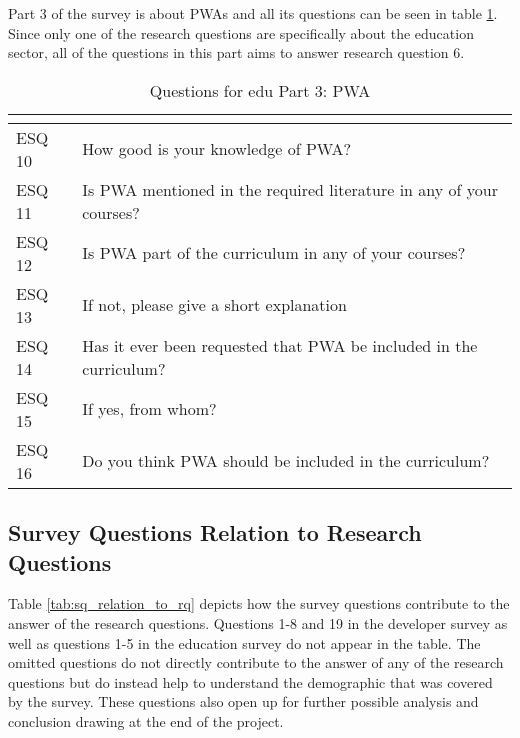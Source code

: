 \documentclass[a4paper,12pt]{article}
\begin{document}
Part 3 of the survey is about PWAs and all its questions can be seen in table \ref{tab:eduq3}. Since only one of the research questions are specifically about the education sector, all of the questions in this part aims to answer research question 6.

\begin{table}[ht]
\centering
{}
\begin{tabular}{|l|l|}
\hline
\rowcolor[HTML]{656565} 
\multicolumn{1}{|c|}{\cellcolor[HTML]{656565}{\color[HTML]{FFFFFF} Number}} & \multicolumn{1}{l|}{\cellcolor[HTML]{656565}{\color[HTML]{FFFFFF} Question}} \\ \hline
ESQ 10 & How good is your knowledge of PWA? \\
ESQ 11 & Is PWA mentioned in the required literature in any of your courses? \\
ESQ 12 & Is PWA part of the curriculum in any of your courses? \\
ESQ 13 & If not, please give a short explanation \\
ESQ 14 & Has it ever been requested that PWA be included in the curriculum? \\
ESQ 15 & If yes, from whom? \\
ESQ 16 & Do you think PWA should be included in the curriculum? \\
\hline
\end{tabular}
\caption{Questions for edu Part 3: PWA}
\label{tab:eduq3}
\end{table}

\subsection{Survey Questions Relation to Research Questions}
Table \ref{tab:sq_relation_to_rq} depicts how the survey questions contribute to the answer of the research questions. Questions 1-8 and 19 in the developer survey as well as questions 1-5 in the education survey do not appear in the table. The omitted questions do not directly contribute to the answer of any of the research questions but do instead help to understand the demographic that was covered by the survey. These questions also open up for further possible analysis and conclusion drawing at the end of the project.
\end{document}
